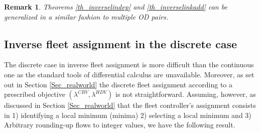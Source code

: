 \documentclass[a4paper,11pt]{article}
\newtheorem{remark}[theorem]{Remark}
\begin{document}
\begin{remark}
Theorems \ref{th_inverselindep} and \ref{th_inverselinkadd} can be generalized in a similar fashion to multiple OD pairs.
\end{remark}

\subsection{Inverse fleet assignment in the discrete case}

\label{Sec_discrete}

The discrete case in inverse fleet assignment is more difficult than the continuous one as the standard tools of differential calculus are unavailable. Moreover, as set out in Section \ref{Sec_realworld} the discrete fleet assignment according to a prescribed objective $(\lambda^{CRV}, \lambda^{HDV})$ is not straightforward. Assuming, however, as discussed in Section \ref{Sec_realworld} that the fleet controller's assignment consists in 1) identifying a local minimum (minima) 2) selecting a local minimum and 3) Arbitrary rounding-up flows to integer values, we have the following result.
\end{document}
